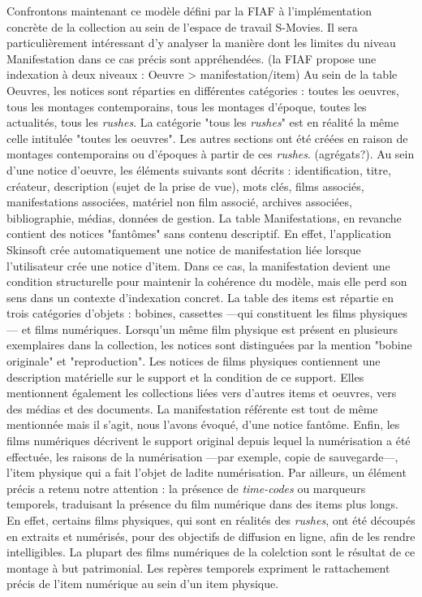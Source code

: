 Confrontons maintenant ce modèle défini par la FIAF à l'implémentation concrète de la collection au sein de l'espace de travail S-Movies. Il sera particulièrement intéressant d'y analyser la manière dont les limites du niveau Manifestation dans ce cas précis sont appréhendées. (la FIAF propose une indexation à deux niveaux : Oeuvre > manifestation/item)
Au sein de la table Oeuvres, les notices sont réparties en différentes catégories : toutes les oeuvres, tous les montages contemporains, tous les montages d'époque, toutes les actualités, tous les \textit{rushes}. La catégorie "tous les \textit{rushes}" est en réalité la même celle intitulée "toutes les oeuvres". Les autres sections ont été créées en raison de montages contemporains ou d'époques à partir de ces \textit{rushes}. (agrégats?). Au sein d'une notice d'oeuvre, les éléments suivants sont décrits : identification, titre, créateur, description (sujet de la prise de vue), mots clés, 
films associés, manifestations associées, matériel non film associé, archives associées, bibliographie, médias, données de gestion. La table Manifestations, en revanche contient des notices "fantômes" sans contenu descriptif. En effet, l'application Skinsoft crée automatiquement une notice de manifestation liée lorsque l'utilisateur crée une notice d'item. 
Dans ce cas, la manifestation devient une condition structurelle pour maintenir la cohérence du modèle, mais elle perd son sens dans un contexte d'indexation concret. La table des items est répartie en trois catégories d'objets : bobines, cassettes ---qui constituent les films physiques--- et films numériques. Lorsqu'un même film physique est présent en plusieurs exemplaires dans la collection, les notices sont distinguées par la mention "bobine originale" et "reproduction". Les notices de films physiques contiennent une description matérielle sur le support et la condition de ce support. Elles mentionnent également les collections liées vers d'autres items et oeuvres, vers des médias et des documents. La manifestation référente est tout de même mentionnée mais il s'agit, nous l'avons évoqué, d'une notice fantôme. Enfin, les films numériques décrivent le support original depuis lequel la numérisation a été effectuée, les raisons de la numérisation ---par exemple, copie de sauvegarde---, l'item physique qui a fait l'objet de ladite numérisation. Par ailleurs, un élément précis a retenu notre attention : la présence de \textit{time-codes} ou marqueurs temporels, traduisant la présence du film numérique dans des items plus longs. En effet, certains films physiques, qui sont en réalités des \textit{rushes}, ont été découpés en extraits et numérisés, pour des objectifs de diffusion en ligne, afin de les rendre intelligibles. La plupart des films numériques de la colelction sont le résultat de ce montage à but patrimonial. Les repères temporels expriment le rattachement précis de l'item numérique au sein d'un item physique.
